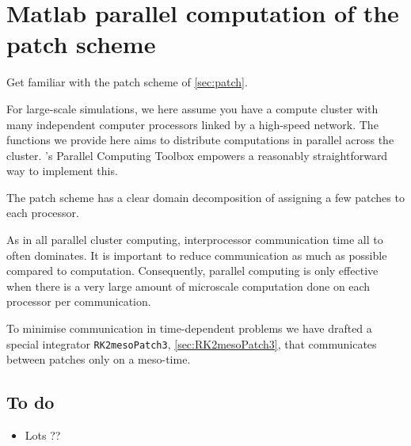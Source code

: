 \chapter{Matlab parallel computation of the patch scheme}
\label{sec:parallel}
\localtableofcontents


Get familiar with the patch scheme of \cref{sec:patch}.

For large-scale simulations, we here assume you have a compute cluster with many independent computer processors linked by a high-speed network.
The functions we provide here aims to distribute computations in parallel across the cluster.
\Matlab's Parallel Computing Toolbox empowers a reasonably straightforward way to implement this.

The patch scheme has a clear domain decomposition of assigning a few patches to each processor.  

As in all parallel cluster computing, interprocessor communication time all to often dominates.  It is important to reduce communication as much as possible compared to computation.  Consequently, parallel computing is only effective when there is a very large amount of microscale computation done on each processor per communication.

To minimise communication in time-dependent problems we have drafted a special integrator \verb|RK2mesoPatch3|,  \cref{sec:RK2mesoPatch3}, that communicates between patches only on a meso-time.








\begin{devMan}




\section{To do}
\begin{itemize}
\item Lots ??
\end{itemize}

\end{devMan}
